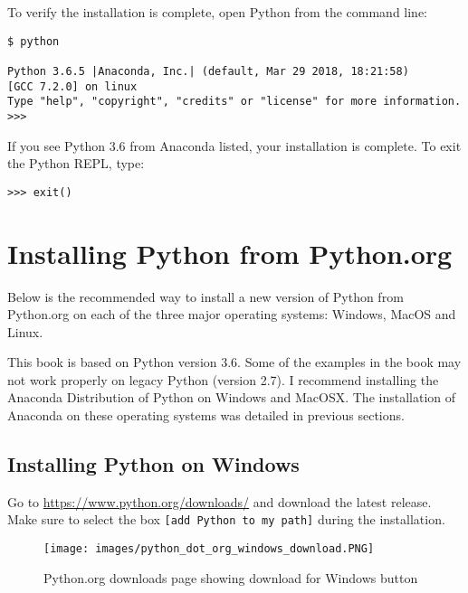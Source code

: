 \documentclass{book}
\makeatletter
\def\maxwidth{\ifdim\Gin@nat@width>\linewidth\linewidth
\else\Gin@nat@width\fi}
\let\Oldincludegraphics\includegraphics
\renewcommand{\includegraphics}[1]{\Oldincludegraphics[width=.8\maxwidth]{#1}}
\newcommand{\passthrough}[1]{#1}
\makeatother
\begin{document}
To verify the installation is complete, open Python from the command
line:

\begin{lstlisting}
$ python

Python 3.6.5 |Anaconda, Inc.| (default, Mar 29 2018, 18:21:58)
[GCC 7.2.0] on linux
Type "help", "copyright", "credits" or "license" for more information.
>>>
\end{lstlisting}

If you see Python 3.6 from Anaconda listed, your installation is
complete. To exit the Python REPL, type:

\begin{lstlisting}
>>> exit()
\end{lstlisting}
    




    
        \hypertarget{installing-python-from-python.org}{%
\section{Installing Python from
Python.org}\label{installing-python-from-python.org}}
    




    
        Below is the recommended way to install a new version of Python from
Python.org on each of the three major operating systems: Windows, MacOS
and Linux.

This book is based on Python version 3.6. Some of the examples in the
book may not work properly on legacy Python (version 2.7). I recommend
installing the Anaconda Distribution of Python on Windows and MacOSX.
The installation of Anaconda on these operating systems was detailed in
previous sections.
    




    
        \hypertarget{installing-python-on-windows}{%
\subsection{Installing Python on
Windows}\label{installing-python-on-windows}}

Go to \url{https://www.python.org/downloads/} and download the latest
release. Make sure to select the box
\passthrough{\lstinline![add Python to my path]!} during the
installation.

\begin{figure}
\centering
\texttt{[image: images/python\_dot\_org\_windows\_download.PNG]}
\caption{Python.org downloads page showing download for Windows button}
\end{figure}
    
\end{document}
